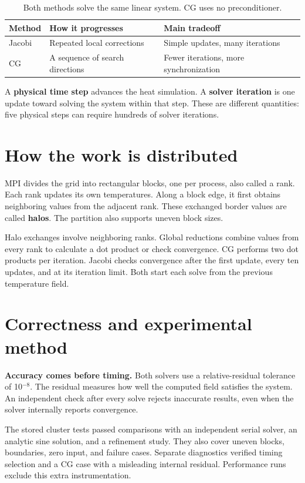\documentclass[11pt]{article}
\begin{document}
\begin{table}[H]
\centering\small
\begin{tabular}{lll}
\toprule
Method & How it progresses & Main tradeoff \\
\midrule
Jacobi & Repeated local corrections & Simple updates, many iterations \\
CG & A sequence of search directions & Fewer iterations, more synchronization \\
\bottomrule
\end{tabular}
\caption{Both methods solve the same linear system. CG uses no preconditioner.}
\end{table}

A \textbf{physical time step} advances the heat simulation. A \textbf{solver iteration} is one update toward solving the system within that step. These are different quantities: five physical steps can require hundreds of solver iterations.

\clearpage

\section{How the work is distributed}

MPI divides the grid into rectangular blocks, one per process, also called a rank. Each rank updates its own temperatures. Along a block edge, it first obtains neighboring values from the adjacent rank. These exchanged border values are called \textbf{halos}. The partition also supports uneven block sizes.

Halo exchanges involve neighboring ranks. Global reductions combine values from every rank to calculate a dot product or check convergence. CG performs two dot products per iteration. Jacobi checks convergence after the first update, every ten updates, and at its iteration limit. Both start each solve from the previous temperature field.

\section{Correctness and experimental method}

\textbf{Accuracy comes before timing.} Both solvers use a relative-residual tolerance of 10$^{-8}$. The residual measures how well the computed field satisfies the system. An independent check after every solve rejects inaccurate results, even when the solver internally reports convergence.

The stored cluster tests passed comparisons with an independent serial solver, an analytic sine solution, and a refinement study. They also cover uneven blocks, boundaries, zero input, and failure cases. Separate diagnostics verified timing selection and a CG case with a misleading internal residual. Performance runs exclude this extra instrumentation.
\end{document}
